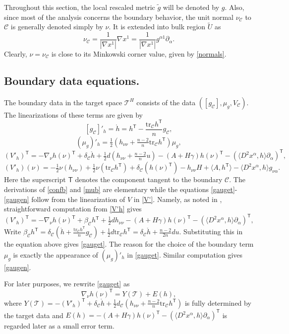\documentclass[10pt]{amsart}
\renewcommand{\a}{\alpha}
\renewcommand{\b}{\beta}
\newcommand{\g}{\gamma}
\renewcommand{\d}{\delta}
\newcommand{\cC}{{\mathcal C}}
\newcommand{\cT}{{\mathcal T}}
\newcommand{\tT}{\mathsf{T}}
\newcommand{\be}{\begin{equation}}
\newcommand{\ee}{\end{equation}}
\newcommand{\tr}{\mathrm{tr}}
\newcommand{\p}{\partial}
\newcommand{\<}{\langle}
\renewcommand{\>}{\rangle}
\newcommand{\w}{\widetilde}
\theoremstyle{plain}
\theoremstyle{remark}
\theoremstyle{definition}
\numberwithin{equation}{section}
\begin{document}
  Throughout this section, the local rescaled metric $\w g$ will be denoted by $g$. Also, since most of the analysis concerns the boundary behavior, 
the unit normal $\nu_{\cC}$ to $\cC$ is generally denoted simply by $\nu$. It is  extended into bulk region $\w U$ as 
$$\nu_{\cC} = \frac{1}{|\nabla x^1|}\nabla x^1 =  \frac{1}{|\nabla x^1|}g^{\a1}\p_{\a}.$$
Clearly, $\nu = \nu_{\cC}$ is close to its Minkowski corner value, given by \eqref{normals}. 

\subsection{Boundary data equations.} 

  The boundary data in the target space $\cT^H$ consists of the data $([g_{\cC}], \mu_g, V_{\cC})$. The linearizations of these terms 
are given by 
\be \label{confb}
[g_{\cC}]'_h = \ring{h} = h^{\tT} - \frac{\tr_{\cC}h^{\tT}}{n}g_{\cC},
\ee
\be \label{mub}
(\mu_g)'_h = \tfrac{1}{2}(h_{\nu \nu} + \tfrac{n-2}{n}\tr_{\cC}h^{\tT})\mu_g,
\ee
\be \label{gauget}
(V'_h)^{\tT} = - \nabla_{\nu}h(\nu)^{\tT} + \d_{\cC}\ring{h}+ \tfrac{1}{2}d (h_{\nu \nu} + \tfrac{n-2}{n}u) - (A + H\g)h(\nu)^{\tT} - (\<D^2 x^{\a}, h\>\p_{\a})^{\tT},
\ee
\be \label{gaugen}
(V'_h)(\nu) = -\tfrac{1}{2}\nu(h_{\nu \nu}) + \tfrac{1}{2}\nu(\tr_{\cC}h^{\tT}) + \d_{\cC}(h(\nu)^{\tT}) - h_{\nu \nu}H + \<A, h^{\tT}\> - \<D^2 x^{\a}, h\>g_{\nu \a}. 
\ee 
Here the superscript $\tT$ denotes the component tangent to the boundary $\cC$. The derivations of \eqref{confb} and \eqref{mub} are elementary while 
the equations \eqref{gauget}-\eqref{gaugen} follow from the linearization of $V$ in \eqref{V'}. Namely, as noted in \cite{I}, straightforward 
computation from \eqref{V'h} gives 
$$(V'_h)^{\tT} = - \nabla_{\nu}h(\nu)^{\tT} + \b_{\cC}h{^\tT}+ \tfrac{1}{2}d h_{\nu \nu} - (A + H\g)h(\nu)^{\tT} - (\<D^2 x^{\a}, h\>\p_{\a})^{\tT},$$
Write $\b_{\cC}h^{\tT} = \d_{\cC}(\ring{h} + \frac{\tr_{\cC}h^{\tT}}{n}g_{\cC}) + \frac{1}{2}d\tr_{\cC}h^{\tT} = \d_{\cC}\ring{h} + \frac{n-2}{2n}d u$. 
Substituting this in the equation above gives \eqref{gauget}. The reason for the choice of the boundary term $\mu_g$ is exactly the appearance 
of $(\mu_g)'_h$ in \eqref{gauget}. Similar computation gives \eqref{gaugen}. 

For later purposes, we rewrite \eqref{gauget} as
\be \label{h_nuT} 
\nabla_{\nu}h(\nu)^{\tT} = Y(\cT) + E(h),
\ee
 where $Y(\cT) = -(V'_h)^{\tT} + \d_{\cC} \ring{h} + \frac{1}{2}d_{\cC}(h_{\nu\nu} + \frac{n-2}{n}\tr_{\cC}h^{\tT})$ is fully determined by the target data and 
 $E(h) = -(A + H\g)h(\nu)^{\tT} - (\<D^2x^{\a}, h\>\p_{\a})^{\tT}$ is regarded later as a small error term. 
 
\end{document}
